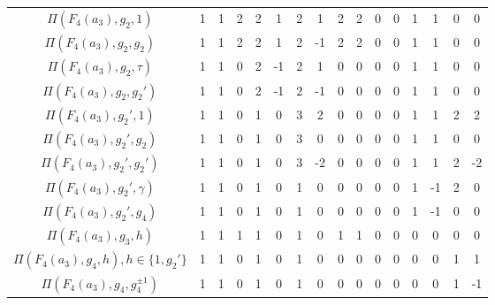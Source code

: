 \begin{landscape}
\begin{table}[ht]
\begin{tabular}{|c|ccc|cccc|cccc|cccc|}
            $\Pi(F_4(a_3),g_2,1)$  & 1 & 1 & 2 & 2 & 1 & 2 & 1 & 2 & 2 & 0 & 0 & 1 & 1 & 0 & 0 \\
            $\Pi(F_4(a_3),g_2,g_2)$ & 1 & 1 & 2 & 2 & 1 & 2 & {-1} & 2 & 2 & 0 & 0 & 1 & 1 & 0 & 0 \\
            $\Pi(F_4(a_3),g_2,\tau)$ & 1 & 1 & 0 & 2 & {-1} & 2 & 1 & 0 & 0 & 0 & 0 & 1 & 1 & 0 & 0 \\
            $\Pi(F_4(a_3),g_2,g_2')$ & 1 & 1 & 0 & 2 & {-1} & 2 & {-1} & 0 & 0 & 0 & 0 & 1 & 1 & 0 & 0 \\\hdashline
            $\Pi(F_4(a_3),g_2',1)$ & 1 & 1 & 0 & 1 & 0 & {3} & 2 & 0 & 0 & 0 & 0 & 1 & 1 & 2 & 2 \\
            $\Pi(F_4(a_3),g_2',g_2)$ & 1 & 1 & 0 & 1 & 0 & {3} & 0 & 0 & 0 & 0 & 0 & 1 & 1 & 0 & 0 \\
            $\Pi(F_4(a_3),g_2',g_2')$ & 1 & 1 & 0 & 1 & 0 & {3} & {-2} & 0 & 0 & 0 & 0 & 1 & 1 & 2 & {-2} \\
            $\Pi(F_4(a_3),g_2',\gamma)$ & 1 & 1 & 0 & 1 & 0 & 1 & 0 & 0 & 0 & 0 & 0 & 1 & {-1} & 2 & 0 \\
            $\Pi(F_4(a_3),g_2',g_4)$ & 1 & 1 & 0 & 1 & 0 & 1 & 0 & 0 & 0 & 0 & 0 & 1 & {-1} & 0 & 0 \\\hdashline
            $\Pi(F_4(a_3),g_3,h)$ & 1 & 1 & 1 & 1 & 0 & 1 & 0 & 1 & 1 & 0 & 0 & 0 & 0 & 0 & 0 \\\hdashline
            $\Pi(F_4(a_3),g_4,h), h\in\{1,g_2'\}$ & 1 & 1 & 0 & 1 & 0 & 1 & 0 & 0 & 0 & 0 & 0 & 0 & 0 & 1 & 1 \\
            $\Pi(F_4(a_3),g_4,g_4^{\pm1})$ & 1 & 1 & 0 & 1 & 0 & 1 & 0 & 0 & 0 & 0 & 0 & 0 & 0 & 1 & {-1} \\\hline
        \end{tabular}
    \end{table}

    
\end{landscape}
  \newpage
    \centering
